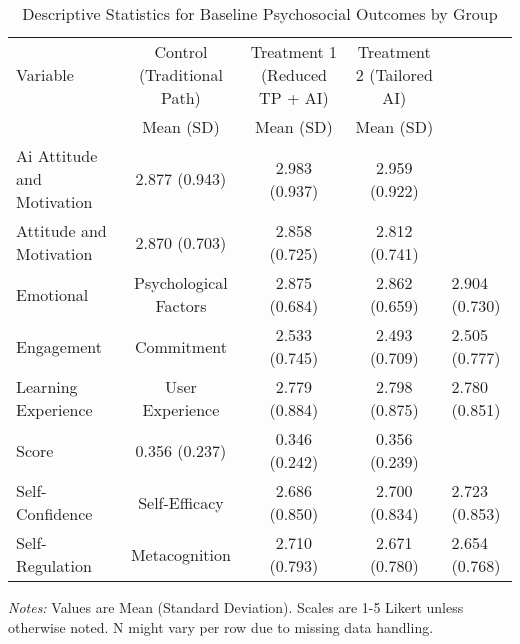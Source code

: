\begin{table}[htbp]
\centering
\begin{threeparttable}
\caption{Descriptive Statistics for Baseline Psychosocial Outcomes by Group}
\label{tab:baseline_outcomes_balance_paper_generated}
\scriptsize
\begin{tabular}{@{}lccc@{}}
\toprule
Variable & Control (Traditional Path) & Treatment 1 (Reduced TP + AI) & Treatment 2 (Tailored AI) \\
 & Mean (SD) & Mean (SD) & Mean (SD)  \\
\midrule
Ai Attitude and Motivation & 2.877 (0.943) & 2.983 (0.937) & 2.959 (0.922)  \\
Attitude and Motivation & 2.870 (0.703) & 2.858 (0.725) & 2.812 (0.741)  \\
Emotional & Psychological Factors & 2.875 (0.684) & 2.862 (0.659) & 2.904 (0.730)  \\
Engagement & Commitment & 2.533 (0.745) & 2.493 (0.709) & 2.505 (0.777)  \\
Learning Experience & User Experience & 2.779 (0.884) & 2.798 (0.875) & 2.780 (0.851)  \\
Score & 0.356 (0.237) & 0.346 (0.242) & 0.356 (0.239)  \\
Self-Confidence & Self-Efficacy & 2.686 (0.850) & 2.700 (0.834) & 2.723 (0.853)  \\
Self-Regulation & Metacognition & 2.710 (0.793) & 2.671 (0.780) & 2.654 (0.768)  \\
\bottomrule
\end{tabular}
\begin{tablenotes}
  \item[] \textit{Notes:} Values are Mean (Standard Deviation). Scales are 1-5 Likert unless otherwise noted. N might vary per row due to missing data handling.
\end{tablenotes}
\end{threeparttable}
\end{table}
